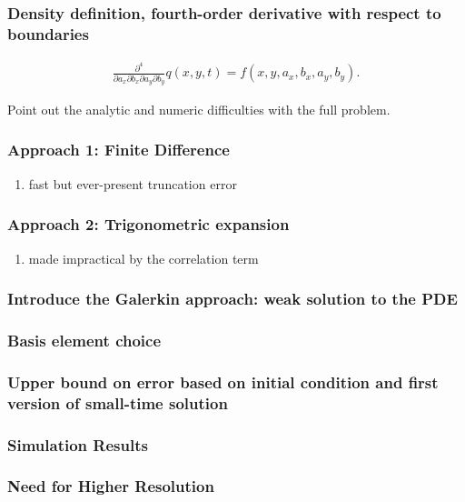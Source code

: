 \documentclass{beamer}
\begin{document}
\begin{frame}
  \frametitle{Density definition, fourth-order derivative with respect to boundaries}

\begin{align}
  \frac{\partial^4}{\partial a_x \partial b_x \partial a_y \partial b_y} q(x,y,t) = f(x,y,a_x,b_x,a_y,b_y).
  \label{eq:pdf}
\end{align}
  
  Point out the analytic and numeric difficulties with the full problem.
\end{frame}
\begin{frame}
  \frametitle{Approach 1: Finite Difference}
  \begin{enumerate}
  \item fast but ever-present truncation error
  \end{enumerate}
\end{frame}
\begin{frame}
  \frametitle{Approach 2: Trigonometric expansion}
  \begin{enumerate}
  \item made impractical by the correlation term
  \end{enumerate}
\end{frame}
\begin{frame}
  \frametitle{Introduce the Galerkin approach: weak solution to the PDE}
\end{frame}
\begin{frame}
  \frametitle{Basis element choice}
\end{frame}
\begin{frame}
  \frametitle{Upper bound on error based on initial condition and
    first version of small-time solution}
\end{frame}
\begin{frame}
  \frametitle{Simulation Results}
\end{frame}
\begin{frame}
  \frametitle{Need for Higher Resolution}
\end{frame}


\end{document}
